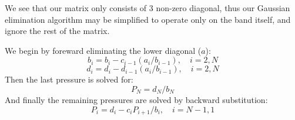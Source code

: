 We see that our matrix only consists of 3 non-zero diagonal, thus our Gaussian elimination algorithm may be simplified to operate only on the band itself, and ignore the rest of the matrix.

We begin by foreward eliminating the lower diagonal ($a$):
\[
  b_i = b_i - c_{i-1} (a_i / b_{i-1}), \quad i=2,N
\]
\[
  d_i = d_i - d_{i-1} (a_i / b_{i-1}), \quad i=2,N
\]
Then the last pressure is solved for:
\[
  P_N = d_N / b_N
\]
And finally the remaining pressures are solved by backward substitution:
\[
  P_i = d_i - c_i P_{i+1}/b_i, \quad i = N-1, 1
\]


